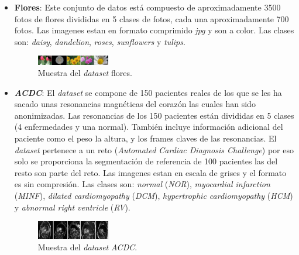 \documentclass[12pt,a4paper]{article}
\begin{document}
\begin{itemize}
\item \textbf{Flores}: Este conjunto de datos está compuesto de aproximadamente 3500 fotos de flores divididas en 5 clases de fotos, cada una aproximadamente 700 fotos. Las imagenes estan en formato comprimido \textit{jpg} y son a color. Las clases son: \textit{daisy}, \textit{dandelion}, \textit{roses}, \textit{sunflowers} y \textit{tulips}.

\begin{figure}[H]
\centering
\includegraphics[width=0.3\textwidth]{img/flores}
\caption{Muestra del \textit{dataset} flores.}
\end{figure}

\item \textbf{\textit{ACDC}}: El \textit{dataset} se compone de 150 pacientes reales de los que se les ha sacado unas resonancias magnéticas del corazón las cuales han sido anonimizadas. Las resonancias de los 150 pacientes están divididas en 5 clases (4 enfermedades y una normal). También incluye información adicional del paciente como el peso la altura, y los frames claves de las resonancias. El \textit{dataset} pertenece a un reto (\textit{Automated Cardiac Diagnosis Challenge}) por eso solo se proporciona la segmentación de referencia de 100 pacientes las del resto son parte del reto. Las imagenes estan en escala de grises y el formato es sin compresión. Las clases son: \textit{normal} (\textit{NOR}), \textit{myocardial infarction} (\textit{MINF}), \textit{dilated cardiomyopathy} (\textit{DCM}), \textit{hypertrophic cardiomyopathy} (\textit{HCM}) y \textit{abnormal right ventricle} (\textit{RV}).

\begin{figure}[H]
\centering
\includegraphics[width=0.3\textwidth]{img/acdc}
\caption{Muestra del \textit{dataset} \textit{ACDC}.}
\end{figure}




\end{itemize}

\end{document}

